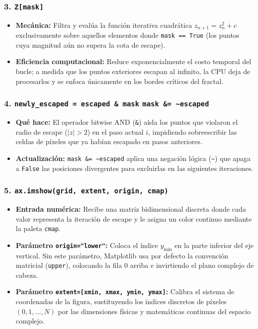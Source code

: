 \documentclass[12pt]{article}
\begin{document}
\begin{cajaflex}
\subsubsection*{\textcolor{teal!70!black}{3. \texttt{Z[mask]} }}
\begin{itemize}
    \item \textbf{Mecánica:} Filtra y evalúa la función iterativa cuadrática $z_{n+1} = z_n^2 + c$ exclusivamente sobre aquellos elementos donde \lstinline|mask == True| (los puntos cuya magnitud aún no supera la cota de escape).
    \item \textbf{Eficiencia computacional:} Reduce exponencialmente el costo temporal del bucle; a medida que los puntos exteriores escapan al infinito, la CPU deja de procesarlos y se enfoca únicamente en los bordes críticos del fractal.
\end{itemize}

\subsubsection*{\textcolor{teal!70!black}{4. \texttt{newly\_escaped = escaped \& mask}  \texttt{mask \&= \textasciitilde escaped}}}
\begin{itemize}
    \item \textbf{Qué hace:} El operador bitwise AND (\lstinline|&|) aísla los puntos que violaron el radio de escape ($|z| > 2$) en el paso actual $i$, impidiendo sobreescribir las celdas de píxeles que ya habían escapado en pasos anteriores.
    \item \textbf{Actualización:} \lstinline|mask &= ~escaped| aplica una negación lógica (\lstinline|~|) que apaga a \lstinline|False| las posiciones divergentes para excluirlas en las siguientes iteraciones.
\end{itemize}

\subsubsection*{\textcolor{teal!70!black}{5. \texttt{ax.imshow(grid, extent, origin, cmap)}}}
\begin{itemize}
    \item \textbf{Entrada numérica:} Recibe una matriz bidimensional discreta donde cada valor representa la iteración de escape y le asigna un color continuo mediante la paleta \texttt{cmap}.
    \item \textbf{Parámetro \texttt{origin="lower"}:} Coloca el índice $y_{\min}$ en la parte inferior del eje vertical. Sin este parámetro, Matplotlib usa por defecto la convención matricial (\texttt{upper}), colocando la fila 0 arriba e invirtiendo el plano complejo de cabeza.
    \item \textbf{Parámetro \texttt{extent=[xmin, xmax, ymin, ymax]}:} Calibra el sistema de coordenadas de la figura, sustituyendo los índices discretos de píxeles $(0, 1, \dots, N)$ por las dimensiones físicas y matemáticas continuas del espacio complejo.
\end{itemize}
\end{cajaflex}
\end{document}
